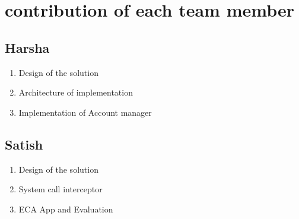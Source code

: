 \section{contribution of each team member}

\subsection{Harsha}

\begin{enumerate}
\item Design of the solution 
\item Architecture of implementation
\item Implementation of Account manager
\end{enumerate}

\subsection{Satish}
\begin{enumerate}
\item Design of the solution
\item System call interceptor
\item ECA App and Evaluation
\end{enumerate}


